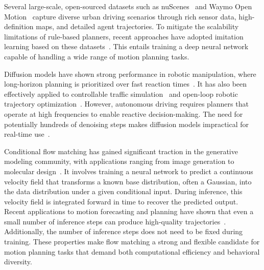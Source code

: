 \documentclass[conference]{IEEEtran}
\begin{document}
Several large-scale, open-sourced datasets such as nuScenes~\cite{nuscenes} and Waymo Open Motion~\cite{womd} capture diverse urban driving scenarios through rich sensor data, high-definition maps, and detailed agent trajectories. To mitigate the scalability limitations of rule-based planners, recent approaches have adopted imitation learning based on these datasets~\cite{goalflow}. This entails training a deep neural network capable of handling a wide range of motion planning tasks.

Diffusion models have shown strong performance in robotic manipulation, where long-horizon planning is prioritized over fast reaction times~\cite{diffusion_tri}. It has also been effectively applied to controllable traffic simulation~\cite{zhong2022guided} and open-loop robotic trajectory optimization~\cite{li2024diffusolve}. However, autonomous driving requires planners that operate at high frequencies to enable reactive decision-making. The need for potentially hundreds of denoising steps makes diffusion models impractical for real-time use~\cite{diffusion_ad}. 



Conditional flow matching has gained significant traction in the generative modeling community, with applications ranging from image generation to molecular design~\cite{basic_flow_matching,fancy_flow_matching}. It involves training a neural network to predict a continuous velocity field that transforms a known base distribution, often a Gaussian, into the data distribution under a given conditional input. During inference, this velocity field is integrated forward in time to recover the predicted output. Recent applications to motion forecasting and planning have shown that even a small number of inference steps can produce high-quality trajectories~\cite{goalflow,cfm_planninng_and_prediction}. Additionally, the number of inference steps does not need to be fixed during training. These properties make flow matching a strong and flexible candidate for motion planning tasks that demand both computational efficiency and behavioral diversity.
\end{document}
